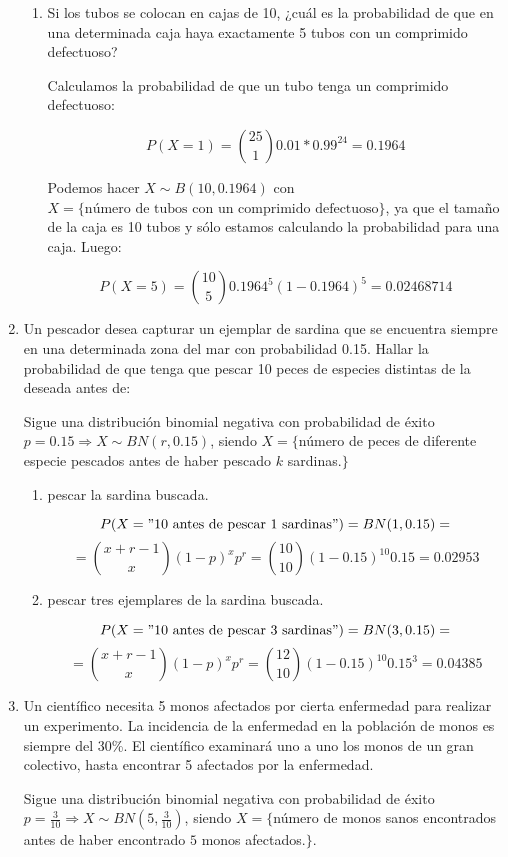 \documentclass[11pt]{article}
\begin{document}
\begin{enumerate}
\begin{enumerate}
\item Si los tubos se colocan en cajas de 10, ¿cuál es la probabilidad de que en una determinada caja haya exactamente 5 tubos con un comprimido defectuoso?

Calculamos la probabilidad de que un tubo tenga un comprimido defectuoso:

\[
P(X=1)=\binom{25}{1}0.01*0.99^{24} =0.1964
\]

Podemos hacer $X \sim B(10, 0.1964)$ con $X = \{\text{número de tubos con un comprimido defectuoso}\} $, ya que el tamaño de la caja es 10 tubos y sólo estamos calculando la probabilidad para una caja. Luego:

\[
P(X=5)=\binom{10}{5}0.1964^5(1-0.1964)^5=0.02468714
\]
\end{enumerate}

\item 

Un pescador desea capturar un ejemplar de sardina que se encuentra siempre en una determinada zona del mar con probabilidad 0.15. Hallar la probabilidad de que tenga que pescar 10 peces de especies distintas de la deseada antes de:

Sigue una distribución binomial negativa con probabilidad de éxito $p=0.15 \Longrightarrow X \sim BN(r,0.15)$, siendo $X=\{$número de peces de diferente especie pescados antes de haber pescado $k$ sardinas.$\}$

\begin{enumerate}

\item pescar la sardina buscada.

\[
P(X="\text{10 antes de pescar 1 sardinas}")=BN(1,0.15)=
\]
\[
=\binom{x+r-1}{x}(1-p)^xp^r=\binom{10}{10}(1-0.15)^{10}0.15=0.02953
\]
\item pescar tres ejemplares de la sardina buscada.

\[
P(X="\text{10 antes de pescar 3 sardinas}")=BN(3,0.15)=
\]
\[
=\binom{x+r-1}{x}(1-p)^xp^r=\binom{12}{10}(1-0.15)^{10}0.15^3=0.04385
\]

\end{enumerate}

\item Un científico necesita 5 monos afectados por cierta enfermedad para realizar un experimento. La incidencia de la enfermedad en la población de monos es siempre del 30\%. El científico examinará uno a uno los monos de un gran colectivo, hasta encontrar 5 afectados por la enfermedad.

Sigue una distribución binomial negativa con probabilidad de éxito $p=\frac{3}{10} \Longrightarrow X \sim BN(5,\frac{3}{10})$, siendo $X=\{$número de monos sanos encontrados antes de haber encontrado $5$ monos afectados.$\}$.



\end{enumerate}
\end{document}

